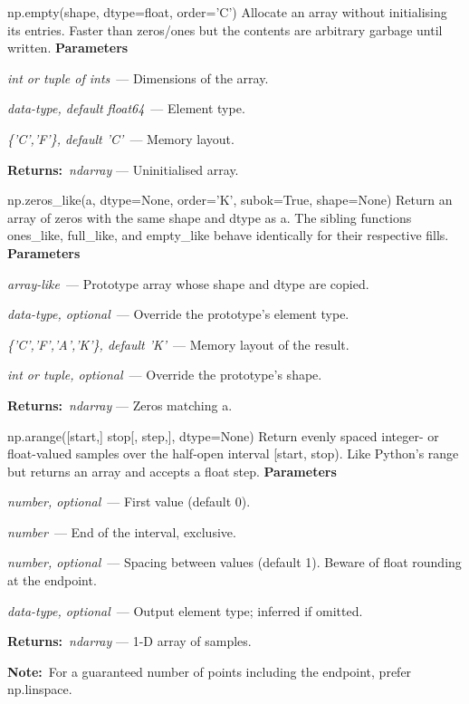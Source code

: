 \documentclass[10pt]{article}
\newenvironment{params}
  {\smallskip\textbf{\small\color{accent}Parameters}\par\nopagebreak
   \begin{description}[leftmargin=1.3em,itemsep=1.5pt,parsep=0pt,topsep=1pt,
      labelindent=0pt,style=sameline,font=\normalfont]}
  {\end{description}}
\newcommand{\pitem}[3]{\item[{\ttfamily\color{accent}#1}]{\itshape #2}\ --- #3}
\newcommand{\preturn}[2]{\smallskip\textbf{\small\color{accent}Returns:}\ {\itshape #1} --- #2\par}
\newcommand{\pnote}[1]{\smallskip\textbf{\small\color{accent}Note:}\ #1\par}
\begin{document}
\begin{func}{np.empty(shape, dtype=float, order='C')}
Allocate an array without initialising its entries. Faster than zeros/ones but the contents are arbitrary garbage until written.
\begin{params}
\pitem{shape}{int or tuple of ints}{Dimensions of the array.}
\pitem{dtype}{data-type, default float64}{Element type.}
\pitem{order}{\{'C','F'\}, default 'C'}{Memory layout.}
\end{params}
\preturn{ndarray}{Uninitialised array.}
\end{func}
\medskip

\begin{func}{np.zeros\_like(a, dtype=None, order='K', subok=True, shape=None)}
Return an array of zeros with the same shape and dtype as a. The sibling functions ones\_like, full\_like, and empty\_like behave identically for their respective fills.
\begin{params}
\pitem{a}{array-like}{Prototype array whose shape and dtype are copied.}
\pitem{dtype}{data-type, optional}{Override the prototype's element type.}
\pitem{order}{\{'C','F','A','K'\}, default 'K'}{Memory layout of the result.}
\pitem{shape}{int or tuple, optional}{Override the prototype's shape.}
\end{params}
\preturn{ndarray}{Zeros matching a.}
\end{func}
\medskip

\begin{func}{np.arange([start,] stop[, step,], dtype=None)}
Return evenly spaced integer- or float-valued samples over the half-open interval [start, stop). Like Python's range but returns an array and accepts a float step.
\begin{params}
\pitem{start}{number, optional}{First value (default 0).}
\pitem{stop}{number}{End of the interval, exclusive.}
\pitem{step}{number, optional}{Spacing between values (default 1). Beware of float rounding at the endpoint.}
\pitem{dtype}{data-type, optional}{Output element type; inferred if omitted.}
\end{params}
\preturn{ndarray}{1-D array of samples.}
\pnote{For a guaranteed number of points including the endpoint, prefer np.linspace.}
\end{func}
\medskip
\end{document}
